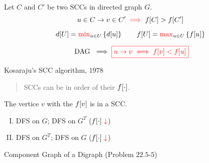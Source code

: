 \begin{frame}{}
  \centerline{}

  \begin{theorem}
    \begin{center}
      Let $C$ and $C'$ be two SCCs in directed graph $G$.
      \[
	u \in C \to v \in C' \textcolor{red}{\;\implies\;} f[C] > f[C']
      \]
    \end{center}
  \end{theorem}

  \pause
  \vspace{0.30cm}
  \[
    d[U] = \textcolor{red}{\min}_{u \in U} \left\{d[u]\right\} \qquad f[U] = \textcolor{red}{\max}_{u \in U} \left\{f[u]\right\}
  \]

  \vspace{0.30cm}
  \[
    \text{ DAG } \implies \textcolor{red}{\boxed{u \to v \iff f[v] < f[u]}}
  \]
\end{frame}

\begin{frame}{}
  \begin{exampleblock}{Kosaraju's SCC algorithm, $1978$}
    \begin{quote}
      \begin{center}
	{\large SCCs can be  in  order of their $f[\cdot]$.}
      \end{center}
    \end{quote}
  \end{exampleblock}

  \pause
  \vspace{0.60cm}
  \centerline{The vertice $v$ with the  $f[v]$ is in a  SCC.}

  \pause
  \vspace{0.60cm}
  \begin{enumerate}[(I)]
    \centering
      \item DFS on $G$; \; DFS on $G^{T}$ ($f[\cdot] \textcolor{red}{\;\downarrow}$) \\[8pt]
      \pause
      \item DFS on $G^{T}$;\; DFS on $G$ \pause ($f[\cdot] \textcolor{red}{\;\downarrow}$)
  \end{enumerate}
\end{frame}

\begin{frame}[fragile]{}
  \begin{exampleblock}{Component Graph of a Digraph (Problem $22.5$-$5$)}
  \end{exampleblock}

  \begin{columns}
      
      
  \end{columns}
\end{frame}
